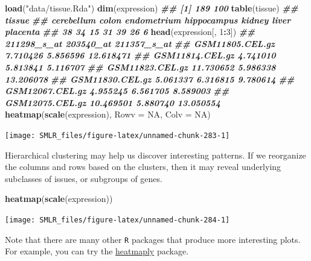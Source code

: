 \documentclass[
]{book}
\newenvironment{Shaded}{\begin{snugshade}}{\end{snugshade}}
\newcommand{\AttributeTok}[1]{\textcolor[rgb]{0.13,0.29,0.53}{#1}}
\newcommand{\ConstantTok}[1]{\textcolor[rgb]{0.56,0.35,0.01}{#1}}
\newcommand{\DecValTok}[1]{\textcolor[rgb]{0.00,0.00,0.81}{#1}}
\newcommand{\DocumentationTok}[1]{\textcolor[rgb]{0.56,0.35,0.01}{\textbf{\textit{#1}}}}
\newcommand{\FunctionTok}[1]{\textcolor[rgb]{0.13,0.29,0.53}{\textbf{#1}}}
\newcommand{\NormalTok}[1]{#1}
\newcommand{\SpecialCharTok}[1]{\textcolor[rgb]{0.81,0.36,0.00}{\textbf{#1}}}
\newcommand{\StringTok}[1]{\textcolor[rgb]{0.31,0.60,0.02}{#1}}
\theoremstyle{definition}
\theoremstyle{definition}
\theoremstyle{definition}
\theoremstyle{definition}
\theoremstyle{remark}
\begin{document}
\begin{Shaded}
\begin{Highlighting}[]
    \FunctionTok{load}\NormalTok{(}\StringTok{"data/tissue.Rda"}\NormalTok{)}
    \FunctionTok{dim}\NormalTok{(expression)}
\DocumentationTok{\#\# [1] 189 100}
    \FunctionTok{table}\NormalTok{(tissue)}
\DocumentationTok{\#\# tissue}
\DocumentationTok{\#\#  cerebellum       colon endometrium hippocampus      kidney       liver    placenta }
\DocumentationTok{\#\#          38          34          15          31          39          26           6}
    \FunctionTok{head}\NormalTok{(expression[, }\DecValTok{1}\SpecialCharTok{:}\DecValTok{3}\NormalTok{])}
\DocumentationTok{\#\#                 211298\_s\_at 203540\_at 211357\_s\_at}
\DocumentationTok{\#\# GSM11805.CEL.gz    7.710426  5.856596   12.618471}
\DocumentationTok{\#\# GSM11814.CEL.gz    4.741010  5.813841    5.116707}
\DocumentationTok{\#\# GSM11823.CEL.gz   11.730652  5.986338   13.206078}
\DocumentationTok{\#\# GSM11830.CEL.gz    5.061337  6.316815    9.780614}
\DocumentationTok{\#\# GSM12067.CEL.gz    4.955245  6.561705    8.589003}
\DocumentationTok{\#\# GSM12075.CEL.gz   10.469501  5.880740   13.050554}
    \FunctionTok{heatmap}\NormalTok{(}\FunctionTok{scale}\NormalTok{(expression), }\AttributeTok{Rowv =} \ConstantTok{NA}\NormalTok{, }\AttributeTok{Colv =} \ConstantTok{NA}\NormalTok{)}
\end{Highlighting}
\end{Shaded}

\begin{center}\texttt{[image: SMLR\_files/figure-latex/unnamed-chunk-283-1]} \end{center}

Hierarchical clustering may help us discover interesting patterns. If we reorganize the columns and rows based on the clusters, then it may reveal underlying subclasses of issues, or subgroups of genes.

\begin{Shaded}
\begin{Highlighting}[]
    \FunctionTok{heatmap}\NormalTok{(}\FunctionTok{scale}\NormalTok{(expression))}
\end{Highlighting}
\end{Shaded}

\begin{center}\texttt{[image: SMLR\_files/figure-latex/unnamed-chunk-284-1]} \end{center}

Note that there are many other \texttt{R} packages that produce more interesting plots. For example, you can try the \href{https://cran.r-project.org/web/packages/heatmaply/vignettes/heatmaply.html}{heatmaply} package.
\end{document}
